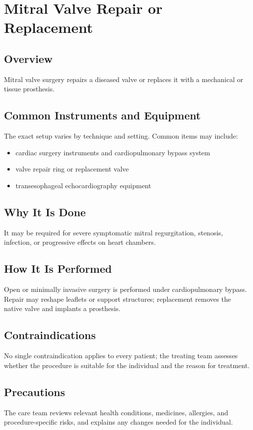\chapter{Mitral Valve Repair or Replacement}
\section*{Overview}
Mitral valve surgery repairs a diseased valve or replaces it with a mechanical or tissue prosthesis.
\section*{Common Instruments and Equipment}
The exact setup varies by technique and setting. Common items may include:
\begin{itemize}[nosep,leftmargin=*]
  \item cardiac surgery instruments and cardiopulmonary bypass system
  \item valve repair ring or replacement valve
  \item transesophageal echocardiography equipment
\end{itemize}

\section*{Why It Is Done}
It may be required for severe symptomatic mitral regurgitation, stenosis, infection, or progressive effects on heart chambers.
\section*{How It Is Performed}
Open or minimally invasive surgery is performed under cardiopulmonary bypass. Repair may reshape leaflets or support structures; replacement removes the native valve and implants a prosthesis.
\section*{Contraindications}
No single contraindication applies to every patient; the treating team assesses whether the procedure is suitable for the individual and the reason for treatment.

\section*{Precautions}
The care team reviews relevant health conditions, medicines, allergies, and procedure-specific risks, and explains any changes needed for the individual.

